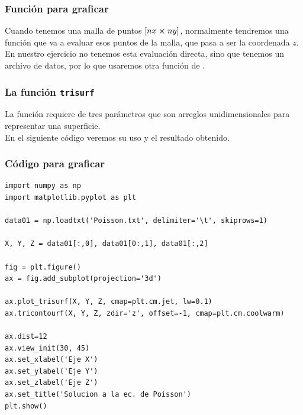 \documentclass[12pt]{beamer}
\begin{document}
\begin{frame}
\frametitle{Función para graficar}
Cuando tenemos una malla de puntos $[nx \cp ny]$, normalmente tendremos una función que va a evaluar esos puntos de la malla, que pasa a ser la coordenada $z$.
\\
\bigskip
\pause
En nuestro ejercicio no tenemos esta evaluación directa, sino que tenemos un archivo de datos, por lo que usaremos otra función de .
\end{frame}
\begin{frame}
\frametitle{La función \texttt{trisurf}}
La función  requiere de tres parámetros que son arreglos unidimensionales para representar una superficie.
\\
\bigskip
\pause
En el siguiente código veremos su uso y el resultado obtenido.
\end{frame}
\begin{frame}
\frametitle{Código para graficar}
\begin{lstlisting}[caption=Código para graficar la solución]
import numpy as np
import matplotlib.pyplot as plt

data01 = np.loadtxt('Poisson.txt', delimiter='\t', skiprows=1)

X, Y, Z = data01[:,0], data01[0:,1], data01[:,2]

fig = plt.figure()
ax = fig.add_subplot(projection='3d')

ax.plot_trisurf(X, Y, Z, cmap=plt.cm.jet, lw=0.1)
ax.tricontourf(X, Y, Z, zdir='z', offset=-1, cmap=plt.cm.coolwarm)

ax.dist=12
ax.view_init(30, 45)
ax.set_xlabel('Eje X')
ax.set_ylabel('Eje Y')
ax.set_zlabel('Eje Z')
ax.set_title('Solucion a la ec. de Poisson')
plt.show()
\end{lstlisting}
\end{frame}
\end{document}
